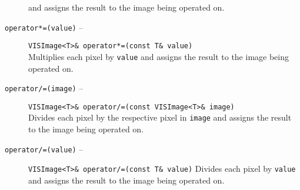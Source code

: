 \begin{description}
and assigns the result to the image being operated on.
\item[{\tt operator*=(value)} --]
{\tt VISImage<T>\& operator*=(const T\& value)}\\
Multiplies each pixel by {\tt value} and assigns the result to the image being
operated on.
\item[{\tt operator/=(image)} --]
{\tt VISImage<T>\& operator/=(const VISImage<T>\& image)}\\
Divides each pixel by the respective pixel in {\tt image}
and assigns the result to the image being operated on.
\item[{\tt operator/=(value)} --]
{\tt VISImage<T>\& operator/=(const T\& value)}
Divides each pixel by {\tt value} and assigns the result to the image being
operated on.
\end{description}

